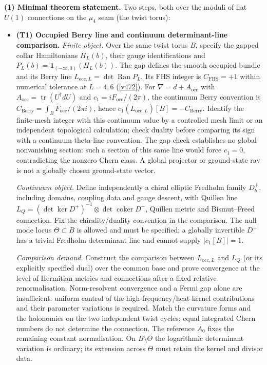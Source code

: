 \par\smallskip\noindent\textbf{(1) Minimal theorem statement.} Two steps, both over the moduli
of flat $U(1)$ connections on the $\mu_4$ seam (the twist torus):
\begin{itemize}
\item \textbf{(T1) Occupied Berry line and continuum determinant-line comparison.}
  \emph{Finite object.} Over the same twist torus $B$, specify the gapped collar
  Hamiltonians $H_L(b)$, their gauge identifications and
  $P_L(b)=\mathbf{1}_{(-\infty,0)}(H_L(b))$. The gap defines the smooth occupied
  bundle and its Berry line $L_{\mathrm{occ},L}=\det\operatorname{Ran}P_L$.
  Its FHS integer is $C_{\mathrm{FHS}}=+1$ within numerical tolerance at
  $L=4,6$ (\vref{v472}). For $\nabla=d+A_{\mathrm{occ}}$ with
  $A_{\mathrm{occ}}=\operatorname{tr}(U^\dagger dU)$ and $c_1=iF_{\mathrm{occ}}/(2\pi)$,
  the continuum Berry convention is $C_{\mathrm{Berry}}=\int_B F_{\mathrm{occ}}/(2\pi i)$,
  hence $c_1(L_{\mathrm{occ},L})[B]=-C_{\mathrm{Berry}}$.
  Identify the finite-mesh integer with this continuum value by a controlled
  mesh limit or an independent topological calculation; check duality before
  comparing its sign with a continuum theta-line convention.
  The gap check establishes no global nonvanishing section: such a section of
  this same line would force $c_1=0$, contradicting the nonzero Chern class.
  A global projector or ground-state ray is not a globally chosen ground-state vector.

  \emph{Continuum object.} Define independently a chiral elliptic Fredholm family
  $D_b^+$, including domains, coupling data and gauge descent, with Quillen line
  $L_Q=(\det\ker D^+)^{-1}\otimes\det\operatorname{coker}D^+$, Quillen metric
  and Bismut--Freed connection. Fix the chirality/duality convention in the comparison.
  The null-mode locus $\Theta\subset B$ is allowed and must be specified; a globally
  invertible $D^+$ has a trivial Fredholm determinant line and cannot supply $|c_1[B]|=1$.

  \emph{Comparison demand.} Construct the comparison between $L_{\mathrm{occ},L}$
  and $L_Q$ (or its explicitly specified dual) over the common base and prove
  convergence at the level of Hermitian metrics and connections after a fixed
  relative renormalisation. Norm-resolvent convergence and a Fermi gap alone are
  insufficient: uniform control of the high-frequency/heat-kernel contributions
  and their parameter variations is required. Match the curvature forms and the
  holonomies on the two independent twist cycles; equal integrated Chern numbers
  do not determine the connection. The reference $A_0$ fixes the remaining constant
  normalisation. On $B\setminus\Theta$ the logarithmic determinant variation is
  ordinary; its extension across $\Theta$ must retain the kernel and divisor data.


\end{itemize}
